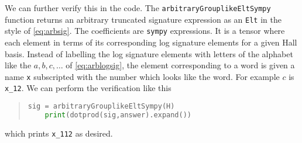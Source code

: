 We can further verify this in the code. The \verb|arbitraryGrouplikeEltSympy| function returns an arbitrary truncated signature expression as an \verb|Elt| in the style of \eqref{eq:arbsig}.
The coefficients are \verb|sympy| expressions. 
It is a tensor where each element in terms of its corresponding log signature elements for a given Hall basis.
Instead of labelling the log signature elements with letters of the alphabet like the $a,b,c,\dots$ of \eqref{eq:arblogsig}, the element corresponding to a word is given a name \verb|x| subscripted with the number which looks like the word. For example $c$ is \verb|x_12|.
We can perform the verification like this
\begin{quotation}
\begin{lstlisting}[language=Python]
    sig = arbitraryGrouplikeEltSympy(H)
    print(dotprod(sig,answer).expand())
\end{lstlisting}
\end{quotation}
which prints \verb|x_112| as desired.

